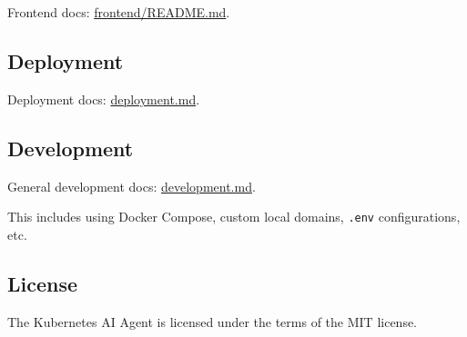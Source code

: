 Frontend docs: \href{./frontend/README.md}{frontend/README.md}.

\hypertarget{deployment}{%
\subsection{Deployment}\label{deployment}}

Deployment docs: \href{./deployment.md}{deployment.md}.

\hypertarget{development}{%
\subsection{Development}\label{development}}

General development docs: \href{./development.md}{development.md}.

This includes using Docker Compose, custom local domains, \texttt{.env}
configurations, etc.

\hypertarget{license}{%
\subsection{License}\label{license}}

The Kubernetes AI Agent is licensed under the terms of the MIT license.
